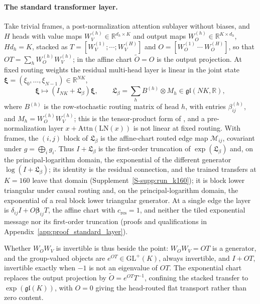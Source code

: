 \documentclass[twoside,11pt]{article}
\begin{document}
\paragraph{The standard transformer layer.}
Take trivial frames, a post-normalization attention sublayer without biases, and $H$ heads with value maps $W_V^{(h)}\in\mathbb R^{d_h\times K}$ and output maps $W_O^{(h)}\in\mathbb R^{K\times d_h}$, $Hd_h=K$, stacked as $T=[W_V^{(1)};\cdots;W_V^{(H)}]$ and $O=[W_O^{(1)}\ \cdots\ W_O^{(H)}]$, so that $OT=\sum_hW_O^{(h)}W_V^{(h)}$; in the affine chart $\widetilde O=O$ is the output projection. At fixed routing weights the residual multi-head layer is linear in the joint state $\boldsymbol\xi=(\xi_0,\ldots,\xi_{N-1})\in\mathbb R^{NK}$,
\begin{equation}
\boldsymbol\xi\longmapsto(I_{NK}+\mathfrak L_\beta)\boldsymbol\xi,\qquad
\mathfrak L_\beta=\sum_hB^{(h)}\otimes M_h\in\mathfrak{gl}(NK,\mathbb R),
\label{eq:standard_joint_layer}
\end{equation}
where $B^{(h)}$ is the row-stochastic routing matrix of head $h$, with entries $\beta_{ij}^{(h)}$, and $M_h=W_O^{(h)}W_V^{(h)}$; this is the tensor-product form of \citet{elhage2021mathematical}, and a pre-normalization layer $x+\mathrm{Attn}(\mathrm{LN}(x))$ is not linear at fixed routing. With frames, the $(i,j)$ block of $\mathfrak L_\beta$ is the affine-chart routed edge map $\mathcal M_{ij}$, covariant under $g=\bigoplus_ig_i$. Thus $I+\mathfrak L_\beta$ is the first-order truncation of $\exp(\mathfrak L_\beta)$ and, on the principal-logarithm domain, the exponential of the different generator $\log(I+\mathfrak L_\beta)$; its identity is the residual connection, and the trained transfers at $K=160$ leave that domain (Supplement~\ref{S-supp:run_k160}); it is block lower triangular under causal routing and, on the principal-logarithm domain, the exponential of a real block lower triangular generator. At a single edge the layer is $\delta_{ij}I+O\boldsymbol\beta_{ij}T$, the affine chart with $c_{\mathrm{res}}=1$, and neither the tiled exponential message nor its first-order truncation (proofs and qualifications in Appendix~\ref{app:proof_standard_layer}).

Whether $W_OW_V$ is invertible is thus beside the point: $W_OW_V=OT$ is a generator, and the group-valued objects are $e^{OT}\in\mathrm{GL}^+(K)$, always invertible, and $I+OT$, invertible exactly when $-1$ is not an eigenvalue of $OT$. The exponential chart replaces the output projection by $\widetilde O=e^{OT}T^{-1}$, confining the stacked transfer to $\exp(\mathfrak{gl}(K))$, with $O=0$ giving the head-routed flat transport rather than zero content.
\end{document}
